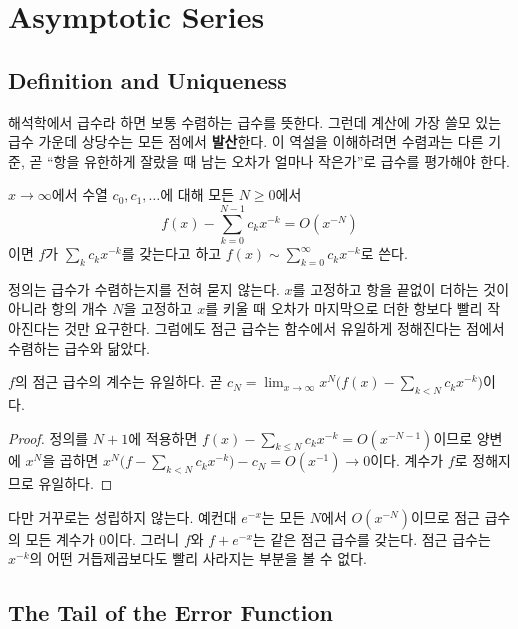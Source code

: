 \section{Asymptotic Series}
\label{sec:asym-series}

\subsection{Definition and Uniqueness}

해석학에서 급수라 하면 보통 수렴하는 급수를 뜻한다. 그런데 계산에 가장 쓸모 있는 급수 가운데 상당수는 모든 점에서 \textbf{발산}한다. 이 역설을 이해하려면 수렴과는 다른 기준, 곧 ``항을 유한하게 잘랐을 때 남는 오차가 얼마나 작은가''로 급수를 평가해야 한다.

\begin{definition}[점근 급수]
\label{def:asym-series}
$x\to\infty$에서 수열 $c_0,c_1,\dots$에 대해 모든 $N\ge0$에서
\[
f(x)-\sum_{k=0}^{N-1}c_kx^{-k}=O(x^{-N})
\]
이면 $f$가  $\sum_kc_kx^{-k}$를 갖는다고 하고 $f(x)\sim\sum_{k=0}^\infty c_kx^{-k}$로 쓴다.
\end{definition}

정의는 급수가 수렴하는지를 전혀 묻지 않는다. $x$를 고정하고 항을 끝없이 더하는 것이 아니라 항의 개수 $N$을 고정하고 $x$를 키울 때 오차가 마지막으로 더한 항보다 빨리 작아진다는 것만 요구한다. 그럼에도 점근 급수는 함수에서 유일하게 정해진다는 점에서 수렴하는 급수와 닮았다.

\begin{proposition}
\label{prop:asym-unique}
$f$의 점근 급수의 계수는 유일하다. 곧 $c_N=\lim_{x\to\infty}x^N\bigl(f(x)-\sum_{k<N}c_kx^{-k}\bigr)$이다.
\end{proposition}

\begin{proof}
정의를 $N+1$에 적용하면 $f(x)-\sum_{k\le N}c_kx^{-k}=O(x^{-N-1})$이므로 양변에 $x^N$을 곱하면 $x^N\bigl(f-\sum_{k<N}c_kx^{-k}\bigr)-c_N=O(x^{-1})\to0$이다. 계수가 $f$로 정해지므로 유일하다.
\end{proof}

다만 거꾸로는 성립하지 않는다. 예컨대 $e^{-x}$는 모든 $N$에서 $O(x^{-N})$이므로 점근 급수의 모든 계수가 $0$이다. 그러니 $f$와 $f+e^{-x}$는 같은 점근 급수를 갖는다. 점근 급수는 $x^{-k}$의 어떤 거듭제곱보다도 빨리 사라지는 부분을 볼 수 없다.

\subsection{The Tail of the Error Function}

